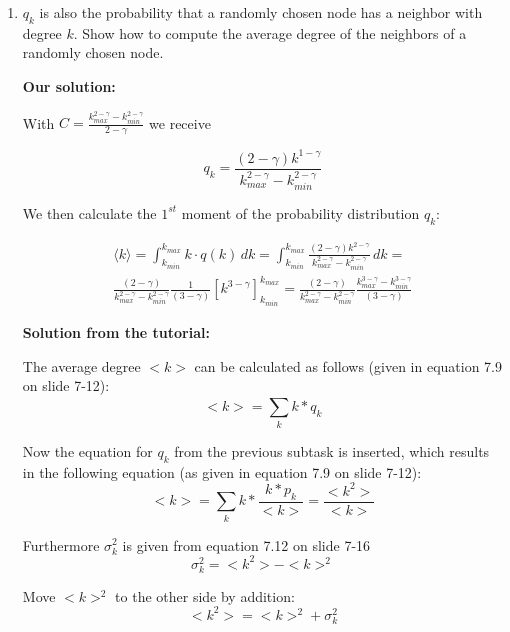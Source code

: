 \begin{enumerate}
	\item $q_k$ is also the probability that a randomly chosen node has a neighbor with degree $k$. Show how to compute the average degree of the neighbors of a randomly chosen node.
	
	\textbf{Our solution:}
	
	With $C = \frac{k_{max}^{2-\gamma} - k_{min}^{2-\gamma}}{2-\gamma}$ we receive
	
	\begin{equation}
		q_k = \frac{(2-\gamma)k^{1-\gamma}}{k_{max}^{2-\gamma} - k_{min}^{2-\gamma}}
	\end{equation}

	We then calculate the $1^{st}$ moment of the probability distribution $q_k$:
	
	\begin{equation} \label{k_neighbors}
		\begin{split}
			\langle k \rangle = \int_{k_{min}}^{k_{max}} k \cdot q(k) \, dk = \int_{k_{min}}^{k_{max}} \frac{(2-\gamma)k^{2-\gamma}}{k_{max}^{2-\gamma} - k_{min}^{2-\gamma}} \, dk = \\
			\frac{(2-\gamma)}{k_{max}^{2-\gamma} - k_{min}^{2-\gamma}} \frac{1}{(3-\gamma)} [k^{3-\gamma}]_{k_{min}}^{k_{max}} = \frac{(2-\gamma)}{k_{max}^{2-\gamma} - k_{min}^{2-\gamma}} \frac{k_{max}^{3-\gamma} - k_{min}^{3-\gamma}}{(3-\gamma)} 
		\end{split}
	\end{equation}
	
	\textbf{Solution from the tutorial:}
	
	The average degree $<k>$ can be calculated as follows (given in equation 7.9 on slide 7-12):
	\begin{equation}
		<k> = \sum_{k}^{} k * q_k
	\end{equation}
	
	Now the equation for $q_k$ from the previous subtask is inserted, which results in the following equation (as given in equation 7.9 on slide 7-12):
	\begin{equation} \label{eq:seven}
		<k> = \sum_{k}^{} k * \frac{k * p_k}{<k>} = \frac{<k^2>}{<k>}
	\end{equation}
	
	Furthermore $\sigma_k^2$ is given from equation 7.12 on slide 7-16
	\begin{equation}
		\sigma_k^2 = <k^2> - <k>^2
	\end{equation}
	
	Move $<k>^2$ to the other side by addition:
	\begin{equation*}
		<k^2> = <k>^2 + \sigma_k^2
	\end{equation*}
	

\end{enumerate}
